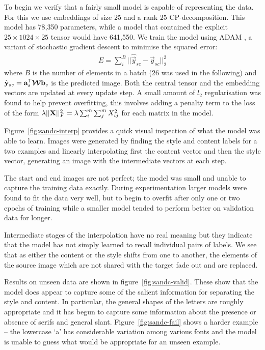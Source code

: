 {To begin we verify that a fairly small model is capable of representing the data. For this we
use embeddings of size \(25\) and a rank \(25\) CP-decomposition. This model has 78,350
parameters, while a model that contained the explicit \(25 \times 1024 \times 25\) tensor
would have 641,550. We train the model using ADAM \autocite{Kingma2014}, a variant of
stochastic gradient descent to minimise the squared error:
\begin{align}
	E = \sum_{i}^B ||\hat{\vec{y}}_{sc} - \vec{y}_{sc}||_2^2
\end{align} where \(B\) is the number of elements in a batch (26 was used in the following) and
\(\hat{\mathbf{y}}_{sc} = \mathbf{a}_s^\mathsf{T}\bm{\mathcal{W}}\mathbf{b}_c\) is the predicted image. Both
the central tensor and the embedding vectors are updated at every update step. A small amount
of \(l_2\) regularisation was found to help prevent overfitting, this involves adding a penalty
term to the loss of the form \(\lambda||\mathbf{X}||_F^2 = \lambda\sum_i^m\sum_j^mX_{ij}^2\) for
each matrix in the model.

Figure~\ref{fig:sandc-interp} provides a quick visual inspection of what the model was able to
learn. Images were generated by finding the style and content labels for a two examples and
linearly interpolating first the content vector and then the style vector, generating an
image with the intermediate vectors at each step. 

The start and end images are not perfect; the model was small and unable to capture the training
data exactly. During experimentation larger models were found to fit the data very well, but to
begin to overfit after only one or two epochs of training while a smaller model tended to perform
better on validation data for longer.

Intermediate stages of the interpolation have no real meaning but they indicate that the model has
not simply learned to recall individual pairs of labels. We see that as either the content or
the style shifts from one to another, the elements of the source image which are not shared with
the target fade out and are replaced.

Results on unseen data are shown in figure~\ref{fig:sandc-valid}. These show that the model does
appear to capture some of the salient information for separating the style and content. In
particular, the general shapes of the letters are roughly appropriate and it has begun to capture
some information about the presence or absence of serifs and general slant.
Figure~\ref{fig:sandc-fail} shows a harder example -- the lowercase `a' has considerable variation
among various fonts and the model is unable to guess what would be appropriate for an unseen
example. 


}

